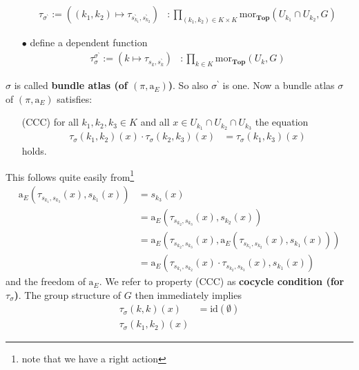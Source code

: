 \begin{exa}[Bundles 2]
\begin{enumerate}
\begin{align*}
  \\
  \tau_{\sigma^{\backprime}}
  :=
  \left(
    (k_{1},k_{2})
    \mapsto
    \tau_{s_{k_{1}}^{\backprime},s_{k_{2}}^{\backprime}}
  \right)
  &\colon
  \prod_{(k_{1},k_{2}) \in K \times K}
  \mathrm{mor}_{\mathbf{Top}}(U_{k_{1}} \cap U_{k_{2}},G)
\end{align*}
\item[$\bullet$]
define a dependent function
\begin{align*}
  \tau_{\sigma}^{\sigma^{\backprime}}
  :=
  \left(
    k
    \mapsto
    \tau_{s_{k},s_{k}^{\backprime}}
  \right)
  &\colon
  \prod_{k \in K}
  \mathrm{mor}_{\mathbf{Top}}(U_{k},G)
\end{align*}
\end{enumerate}
$\sigma$ is called \textbf{bundle atlas (of $(\pi,\mathrm{a}_{E})$)}. So also $\sigma^{\backprime}$ is one. Now a bundle atlas $\sigma$ of $(\pi,\mathrm{a}_{E})$ satisfies:
\begin{enumerate}
\item[(CCC)]
for all $k_{1},k_{2},k_{3} \in K$ and all $x \in U_{k_{1}} \cap U_{k_{2}} \cap U_{k_{3}}$ the equation
\begin{align*}
  \tau_{\sigma}(k_{1},k_{2})(x)
  \cdot
  \tau_{\sigma}(k_{2},k_{3})(x)
  &=
  \tau_{\sigma}(k_{1},k_{3})(x)
\end{align*}
holds.
\end{enumerate}
This follows quite easily from\footnote{note that we have a right action}
\begin{align*}
  \mathrm{a}_{E}
  \left(
    \tau_{s_{k_{1}},s_{k_{3}}}(x),
    s_{k_{1}}(x)
  \right)
  &=
  s_{k_{3}}(x)
  \\
  &=
  \mathrm{a}_{E}
  \left(
    \tau_{s_{k_{2}},s_{k_{3}}}(x),
    s_{k_{2}}(x)
  \right)
  \\
  &=
  \mathrm{a}_{E}
  \left(
    \tau_{s_{k_{2}},s_{k_{3}}}(x),
    \mathrm{a}_{E}
    \left(
      \tau_{s_{k_{1}},s_{k_{2}}}(x),
      s_{k_{1}}(x)
    \right)
  \right)
  \\
  &=
  \mathrm{a}_{E}
  \left(
    \tau_{s_{k_{1}},s_{k_{2}}}(x)
    \cdot
    \tau_{s_{k_{2}},s_{k_{3}}}(x),
    s_{k_{1}}(x)
  \right)
\end{align*}
and the freedom of $\mathrm{a}_{E}$. We refer to property (CCC) as \textbf{cocycle condition (for $\tau_{\sigma}$)}. The group structure of $G$ then immediately implies
\begin{align*}
  \tau_{\sigma}(k,k)(x)
  &=
  \mathrm{id}(\emptyset)
  \\
  \tau_{\sigma}(k_{1},k_{2})(x)

\end{align*}
\end{exa}
